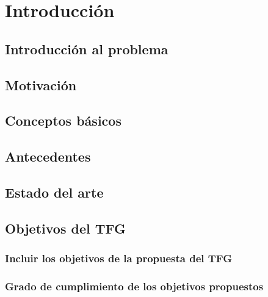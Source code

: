 \chapter {Introducción}

\section{Introducción al problema}
\section{Motivación}
\section{Conceptos básicos}
\section{Antecedentes}
\section{Estado del arte}
\section{Objetivos del TFG}
	\subsection{Incluir los objetivos de la propuesta del TFG}
	\subsection{Grado de cumplimiento de los objetivos propuestos}






